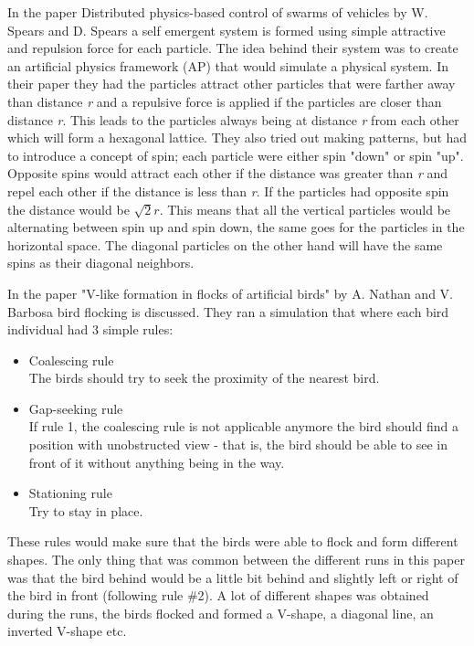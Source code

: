 In the paper Distributed physics-based control of swarms of vehicles by W. Spears and D. Spears a self emergent system is formed using simple attractive and repulsion force for each particle. The idea behind their system was to create an artificial physics framework (AP) that would simulate a physical system. In their paper they had the particles attract other particles that were farther away than distance \textit{r} and a repulsive force is applied if the particles are closer than distance \textit{r}. This leads to the particles always being at distance \textit{r} from each other which will form a hexagonal lattice. They also tried out making patterns, but had to introduce a concept of spin; each particle were either spin "down" or spin "up". Opposite spins would attract each other if the distance was greater than \textit{r} and repel each other if the distance is less than \textit{r}. If the particles had opposite spin the distance would be $\sqrt{2}r$. This means that all the vertical particles would be alternating between spin up and spin down, the same goes for the particles in the horizontal space. The diagonal particles on the other hand will have the same spins as their diagonal neighbors.

In the paper "V-like formation in flocks of artificial birds" by A. Nathan and V. Barbosa bird flocking is discussed. They ran a simulation that where each bird individual had 3 simple rules: 
\begin{itemize}
    \item Coalescing rule \\
        The birds should try to seek the proximity of the nearest bird.
    \item Gap-seeking rule \\
        If rule 1, the coalescing rule is not applicable anymore the bird should find a position with unobstructed view -  that is, the bird should be able to see in front of it without anything being in the way.
    \item Stationing rule \\
        Try to stay in place.
\end{itemize}
These rules would make sure that the birds were able to flock and form different shapes. The only thing that was common between the different runs in this paper was that the bird behind would be a little bit behind and slightly left or right of the bird in front (following rule \#2). A lot of different shapes was obtained during the runs, the birds flocked and formed a V-shape, a diagonal line, an inverted V-shape etc.

